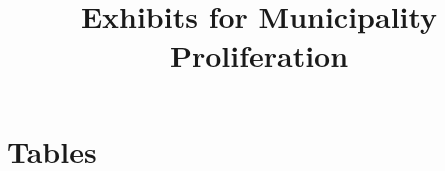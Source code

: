 \documentclass{article}
\title{Exhibits for Municipality Proliferation}
\begin{document}
\maketitle


\section{Tables}






\end{document}
